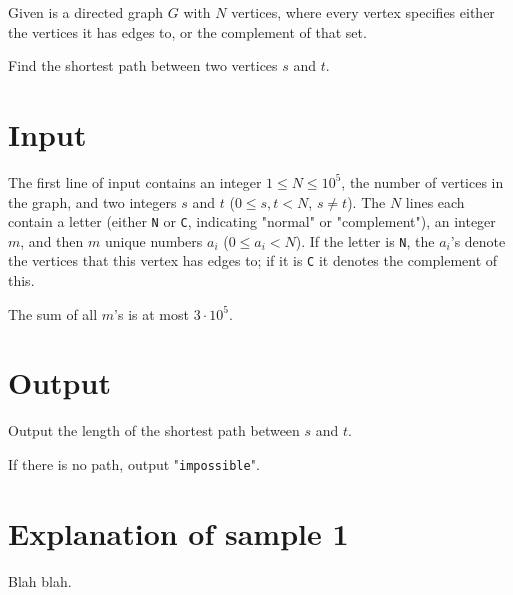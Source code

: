 Given is a directed graph $G$ with $N$ vertices, where every vertex specifies either the vertices it has edges to, or the complement of that set.

Find the shortest path between two vertices $s$ and $t$.

\section*{Input}
The first line of input contains an integer $1 \le N \le 10^5$, the number of vertices in the graph, and two integers $s$ and $t$ ($0 \le s, t < N$, $s \neq t$).
The $N$ lines each contain a letter (either \texttt{N} or \texttt{C}, indicating "normal" or "complement"), an integer $m$, and then $m$ unique numbers $a_i$ ($0 \le a_i < N$).
If the letter is \texttt{N}, the $a_i$'s denote the vertices that this vertex has edges to; if it is \texttt{C} it denotes the complement of this.

The sum of all $m$'s is at most $3 \cdot 10^5$.

\section*{Output}
Output the length of the shortest path between $s$ and $t$.

If there is no path, output "\texttt{impossible}".

\section*{Explanation of sample 1}
Blah blah.
